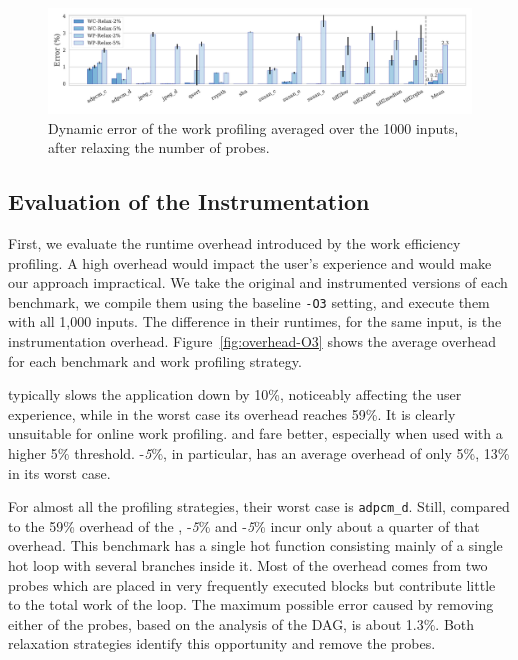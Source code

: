 \begin{figure}[t!]
    \centering
    \includegraphics[width=\textwidth]{figs/error-O3.pdf}
    \caption{Dynamic error of the work profiling averaged over the 1000 inputs, after relaxing the number of probes.}
    \vspace{-3mm}
    \label{fig:error-O3}
\end{figure}


\subsection{Evaluation of the Instrumentation}

First, we evaluate the runtime overhead introduced by the work efficiency profiling. A high overhead would impact the user's experience
and would make our approach impractical. We take the original and instrumented versions of each benchmark, we compile them using the
baseline \texttt{-O3} setting, and execute them with all 1,000 inputs. The difference in their runtimes, for the same input, is the
instrumentation overhead. Figure~\ref{fig:overhead-O3} shows the average overhead for each benchmark and work profiling strategy. 

\OptProf typically slows the application down by 10\%, noticeably affecting the user experience, while in the worst case its overhead
reaches 59\%. It is clearly unsuitable for online work profiling. \WCRelax and \WPRelax fare better, especially when used with a higher
5\% threshold. \WPRelax-\textit{5}\%, in particular, has an average overhead of only 5\%, 13\% in its worst case. 

For almost all the profiling strategies, their worst case is \texttt{adpcm\_d}. Still, compared to the 59\% overhead of the \OptProf,
\WCRelax-\textit{5}\% and \WPRelax-\textit{5}\% incur only about a quarter of that overhead. This benchmark has a single hot function
consisting mainly of a single hot loop with several branches inside it. Most of the overhead comes from two probes which are placed in
very frequently executed blocks but contribute little to the total work of the loop. The maximum possible error caused by removing either
of the probes, based on the analysis of the DAG, is about 1.3\%. Both relaxation strategies identify this opportunity and remove the probes.

